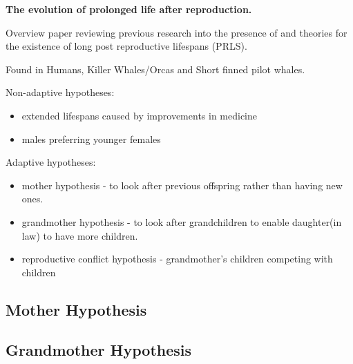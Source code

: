 \documentclass[authoryearcitations]{UoYCSproject}
\begin{document}
\begin{framed}
\noindent \textbf{The evolution of prolonged life after reproduction. \cite{evolutionPRLS2015}}

Overview paper reviewing previous research into the presence of and theories for the existence of long post reproductive lifespans (PRLS).

Found in Humans, Killer Whales/Orcas and Short finned pilot whales.

\noindent Non-adaptive hypotheses:
\begin{itemize}
    \item extended lifespans caused by improvements in medicine
    \item males preferring younger females
\end{itemize}

\noindent Adaptive hypotheses:
\begin{itemize}
    \item mother hypothesis - to look after previous offspring rather than having new ones.
    \item grandmother hypothesis - to look after grandchildren to enable daughter(in law) to have more children.
    \item reproductive conflict hypothesis - grandmother’s children competing with children
\end{itemize}
\end{framed}

\subsection{Mother Hypothesis}
\subsection{Grandmother Hypothesis}
\end{document}

